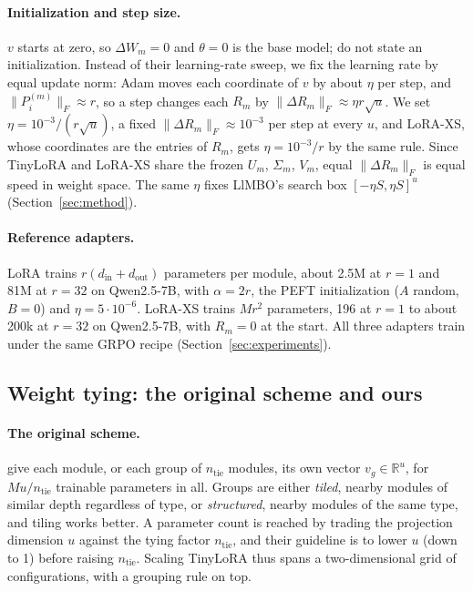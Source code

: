 \documentclass[twoside]{article}
\newcommand{\mbR}{\mathbb{R}}
\newcommand{\llmbo}{LlMBO}
\begin{document}
\paragraph{Initialization and step size.}
$v$ starts at zero, so $\Delta W_m = 0$ and $\theta = 0$ is the base model; \citet{morris2026learning} do not state an initialization. Instead of their learning-rate sweep, we fix the learning rate by equal update norm: Adam moves each coordinate of $v$ by about $\eta$ per step, and $\|P^{(m)}_i\|_F \approx r$, so a step changes each $R_m$ by $\|\Delta R_m\|_F \approx \eta r \sqrt{u}$. We set $\eta = 10^{-3} / (r \sqrt{u})$, a fixed $\|\Delta R_m\|_F \approx 10^{-3}$ per step at every $u$, and LoRA-XS, whose coordinates are the entries of $R_m$, gets $\eta = 10^{-3}/r$ by the same rule. Since TinyLoRA and LoRA-XS share the frozen $U_m$, $\Sigma_m$, $V_m$, equal $\|\Delta R_m\|_F$ is equal speed in weight space. The same $\eta$ fixes \llmbo{}'s search box $[-\eta S, \eta S]^u$ (Section~\ref{sec:method}).

\paragraph{Reference adapters.}
LoRA \citep{hu2022lora} trains $r(d_\mathrm{in} + d_\mathrm{out})$ parameters per module, about 2.5M at $r = 1$ and 81M at $r = 32$ on Qwen2.5-7B, with $\alpha = 2r$, the PEFT initialization ($A$ random, $B = 0$) and $\eta = 5 \cdot 10^{-6}$. LoRA-XS trains $M r^2$ parameters, 196 at $r = 1$ to about 200k at $r = 32$ on Qwen2.5-7B, with $R_m = 0$ at the start. All three adapters train under the same GRPO recipe (Section~\ref{sec:experiments}).

\subsection{Weight tying: the original scheme and ours}
\label{app:tying}

\paragraph{The original scheme.}
\citet{morris2026learning} give each module, or each group of $n_\mathrm{tie}$ modules, its own vector $v_g \in \mbR^u$, for $M u / n_\mathrm{tie}$ trainable parameters in all. Groups are either \emph{tiled}, nearby modules of similar depth regardless of type, or \emph{structured}, nearby modules of the same type, and tiling works better. A parameter count is reached by trading the projection dimension $u$ against the tying factor $n_\mathrm{tie}$, and their guideline is to lower $u$ (down to 1) before raising $n_\mathrm{tie}$. Scaling TinyLoRA thus spans a two-dimensional grid of configurations, with a grouping rule on top.
\end{document}
